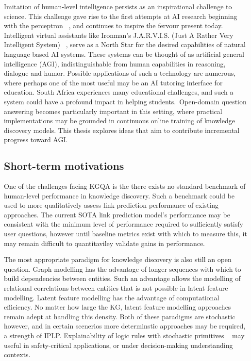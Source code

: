 Imitation of human-level intelligence persists as an inspirational challenge to science. This challenge gave rise to the first attempts at AI research beginning with the perceptron \unskip~\citep{rosenblatt1958perceptron}, and continues to inspire the fervour present today. Intelligent virtual assistants like Ironman's J.A.R.V.I.S. (Just A Rather Very Intelligent System) \unskip~\citep{jarvisIronmanWiki}, serve as a North Star for the desired capabilities of natural language based AI systems. These systems can be thought of as artificial general intelligence (AGI), indistinguishable from human capabilities in reasoning, dialogue and humor. Possible applications of such a technology are numerous, where perhaps one of the most useful may be an AI tutoring interface for education. South Africa experiences many educational challenges, and such a system could have a profound impact in helping students.\ Open-domain question answering becomes particularly important in this setting, where practical implementations may be grounded in continuous online training of knowledge discovery models. This thesis explores ideas that aim to contribute incremental progress toward AGI.  

\subsection{Short-term motivations}

One of the challenges facing KGQA is the there exists no standard benchmark of human-level performance in knowledge discovery. Such a benchmark could be used to more qualitatively assess link prediction performance of existing approaches. The current SOTA link prediction model's performance may be consistent with the minimum level of performance required to sufficiently satisfy user questions, however until baseline metrics exist with which to measure this, it may remain difficult to quantitaviley validate gains in performance. \par

\noindent The most appropriate paradigm for knowledge discovery is also still an open question. Graph modelling has the advantage of longer sequences with which to build dependencies between entities. Such an advantage allows the modelling of relational correlations between entities that is not possible in latent feature modelling. Latent feature modelling has the advantage of computational efficiency. No matter how large the KG, latent feature modelling approaches remain adept at handling this density. Both of these paradigms are stochastic however, and in certain scenerios more determinstic approaches may be required, a strength of IPLP. Explainability of logic rules with stochastic primitives \unskip~\citep{yang2017differentiable} may useful in safety-critical applications, or under decision-making understanding contexts. \par

